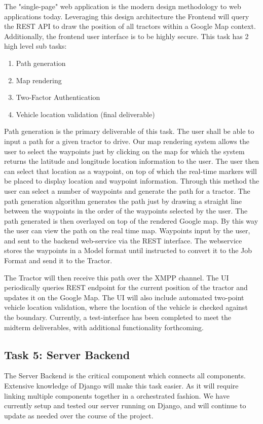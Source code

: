\documentclass[conference,12pt]{IEEEtran}
\begin{document}
The "single-page" web application is the modern design methodology to web
applications
today. Leveraging this design architecture the Frontend will query the REST API
to draw the position of all tractors within a Google Map context. Additionally, 
the frontend user interface is to be highly secure. This task has
2 high level sub tasks:

\begin{enumerate}
\item Path generation
\item Map rendering
\item Two-Factor Authentication
\item Vehicle location validation (final deliverable)
\end{enumerate}

Path generation is the primary deliverable of this task. The user shall be able
to input a path for a given tractor to drive. Our map rendering system allows
the user to select the waypoints just by clicking on the map for which the
system returns the latitude and longitude location information to the user. The
user then can select that location as a waypoint, on top of which the real-time
markers will be placed to display location and waypoint information. Through
this method the user can select a number of waypoints and generate the path for
a tractor. The path generation algorithm generates the path just by drawing
a straight line between the waypoints in the order of the waypoints selected by
the user. The path generated is then overlayed on top of the rendered Google
map. By this way the user can view the path on the real time map.  Waypoints
input by the user, and sent to the backend web-service via the REST interface.
The webservice stores the waypoints in a Model format until instructed to
convert it to the Job Format and send it to the Tractor.

The Tractor will then receive this path over the XMPP channel.  The UI
periodically queries REST endpoint for the current position of the tractor and
updates it on the Google Map. The UI will also include automated two-point
vehicle location validation, where the location of the vehicle is checked
against the boundary. Currently, a test-interface has been completed to meet the
midterm deliverables, with additional functionality forthcoming.

\subsection{Task 5: Server Backend}
The Server Backend is the critical component which connects all components.
Extensive knowledge of Django will make this task easier. As it will require
linking multiple components together in a orchestrated fashion. We have
currently setup and tested our server running on Django, and will continue to
update as needed over the course of the project. 
\end{document}
